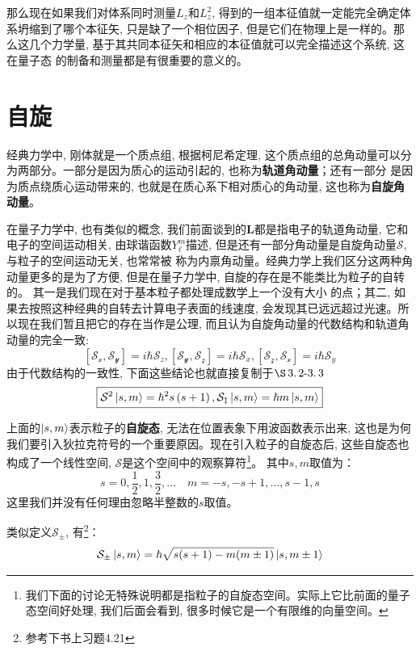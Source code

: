 \documentclass[a4paper,zihao=-4,linespread=1]{ctexrep}
\begin{document}
    那么现在如果我们对体系同时测量$L_z$和$L_z^2$, 得到的一组本征值就一定能完全确定体系坍缩到了哪个本征矢, 只是缺了一个相位因子, 但是它们在物理上是一样的。那么这几个力学量, 基于其共同本征矢和相应的本征值就可以完全描述这个系统, 这在量子态
    的制备和测量都是有很重要的意义的。

    \section{自旋}
    经典力学中, 刚体就是一个质点组, 根据柯尼希定理, 这个质点组的总角动量可以分为两部分。一部分是因为质心的运动引起的, 也称为\textbf{轨道角动量}；还有一部分
    是因为质点绕质心运动带来的, 也就是在质心系下相对质心的角动量, 这也称为\textbf{自旋角动量}。

    在量子力学中, 也有类似的概念, 我们前面谈到的$\bm{L}$都是指电子的轨道角动量, 它和电子的空间运动相关, 由球谐函数$Y_\ell^m$描述, 但是还有一部分角动量是自旋角动量$\mathcal{S}$, 与粒子的空间运动无关, 也常常被
    称为内禀角动量。经典力学上我们区分这两种角动量更多的是为了方便, 但是在量子力学中, 自旋的存在是不能类比为粒子的自转的。 其一是我们现在对于基本粒子都处理成数学上一个没有大小
    的点；其二, 如果去按照这种经典的自转去计算电子表面的线速度, 会发现其已远远超过光速。所以现在我们暂且把它的存在当作是公理, 而且认为自旋角动量的代数结构和轨道角动量的完全一致:
    \begin{equation}
        \boxed{\left[\mathcal{S_x},\mathcal{S_y}\right]=i\hbar \mathcal{S}_z,\left[\mathcal{S_y},\mathcal{S_z}\right]=i\hbar \mathcal{S}_x,\left[\mathcal{S_z},\mathcal{S_x}\right]=i\hbar \mathcal{S}_y}
    \end{equation}
    由于代数结构的一致性, 下面这些结论也就直接复制于$\S \operatorname{3.2-3.3}$
    \begin{equation}
        \boxed{\mathcal{S}^2\ket{s,m}=\hbar^2s\left(s+1\right),\mathcal{S_z}\ket{s,m}=\hbar m\ket{s,m}}
    \end{equation}

    上面的$\ket{s,m}$表示粒子的\textbf{自旋态}, 无法在位置表象下用波函数表示出来, 这也是为何我们要引入狄拉克符号的一个重要原因。现在引入粒子的自旋态后, 这些自旋态也
    构成了一个线性空间, $\mathcal{S}$是这个空间中的观察算符\footnote{我们下面的讨论无特殊说明都是指粒子的自旋态空间。实际上它比前面的量子态空间好处理, 我们后面会看到, 很多时候它是一个有限维的向量空间。}。
    其中$s,m$取值为：
    \[s=0,\frac{1}{2},1,\frac{3}{2},\ldots\quad m=-s,-s+1,\ldots,s-1,s\]
    这里我们并没有任何理由忽略半整数的$s$取值。

    类似定义$\mathcal{S}_\pm$, 有\footnote{参考下书上习题4.21}：
    \begin{equation}
        \label{eq:4.60}
        \mathcal{S_\pm}\ket{s,m}=\hbar\sqrt{s(s+1)-m(m\pm 1)}\ket{s,m\pm 1}
    \end{equation}
\end{document}
